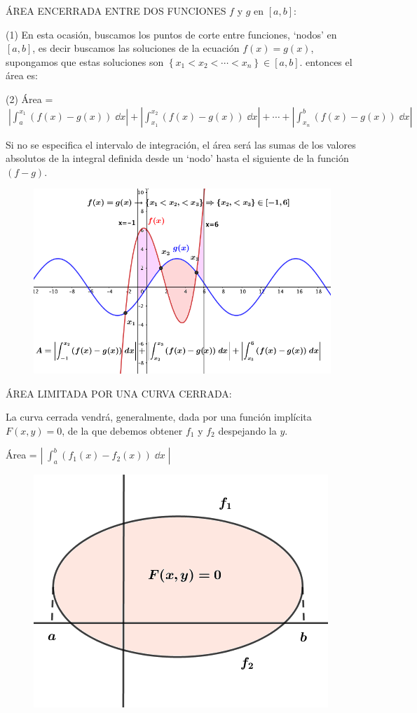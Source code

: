 ÁREA ENCERRADA ENTRE DOS FUNCIONES $f$ y $g$ en $[a,b]$:

\hspace{5 mm} (1) En esta ocasión, buscamos los puntos de corte entre funciones, `nodos' en $[a,b]$, es decir buscamos las soluciones de la ecuación $f(x)=g(x)$, supongamos que estas soluciones son  $\left\{x_1<x_2< \cdots <x_n\right\} \in  [a,b]$. entonces el área es:

\hspace{5 mm} (2) Área = $\; \displaystyle \left| \int_a^{x_1} (f(x)-g(x)) \; \dd x \right| + \left| \int_{x_1}^{x_2} (f(x)-g(x)) \; \dd x \right| + \cdots + \left| \int_{x_n}^b (f(x)-g(x)) \; \dd x \right| $

Si no se especifica el intervalo de integración, el área será las sumas de los valores absolutos de la integral definida desde un `nodo' hasta el siguiente de la función $(f-g)$.

	\begin{figure}[H]
 		\centering
		\includegraphics[width=.75
		\textwidth]{imagenes/imagenes08/T08IM13.png}
	\end{figure}

ÁREA LIMITADA POR UNA CURVA CERRADA:
\begin{multicols}{2}
La curva cerrada vendrá, generalmente, dada por una función implícita $F(x,y)=0$, de la que debemos obtener $f_1$ y $f_2$ despejando la $y$.

\vspace{5mm} Área = $\displaystyle \left| \; \int_a^b (f_1(x)-f_2(x))\; \dd x \; \right|$

	\begin{figure}[H]
 		\centering
		\includegraphics[width=.4\textwidth]{imagenes/imagenes08/T08IM14.png}
	\end{figure}
\end{multicols}

